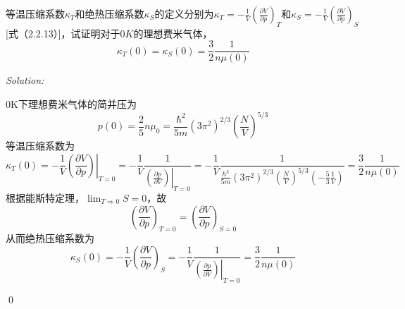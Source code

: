 \documentclass[12pt,a4paper]{article}
\newenvironment{problem}[2][Problem]{\begin{trivlist}
\item[\hskip \labelsep {\bfseries #1}\hskip \labelsep {\bfseries #2.}]}{\end{trivlist}}
\newenvironment{sol}
    {\emph{Solution:}
    }
    {
    \qed
    }
\begin{document}
\begin{problem}{8.17}
等温压缩系数$\kappa_T$和绝热压缩系数$\kappa_S$的定义分别为$\kappa_T=-\frac{1}{V}\left(\frac{\partial V}{\partial p}\right)_T$和$\kappa_S=-\frac{1}{V}\left(\frac{\partial V}{\partial p}\right)_S$[式（2.2.13）]，试证明对于$0K$的理想费米气体，
\[
\kappa_T(0)=\kappa_S(0)=\frac{3}{2}\frac{1}{n\mu(0)}
\]
\end{problem}
\begin{sol}
$0$K下理想费米气体的简并压为
\begin{equation}
p(0)=\frac{2}{5}n\mu_0=\frac{\hbar^2}{5m}(3\pi^2)^{2/3}\left(\frac{N}{V}\right)^{5/3}
\end{equation}
等温压缩系数为
\begin{equation}
\kappa_T(0)=-\frac{1}{V}\left.\left(\frac{\partial V}{\partial p}\right)\right|_{T=0}=-\frac{1}{V}\frac{1}{\left(\left.\frac{\partial p}{\partial V}\right)\right|_{T=0}}=-\frac{1}{V}\frac{1}{\frac{\hbar^3}{5m}(3\pi^2)^{2/3}\left(\frac{N}{V}\right)^{5/3}\left(-\frac{5}{3}\frac{1}{V}\right)}=\frac{3}{2}\frac{1}{n\mu(0)}
\end{equation}
根据能斯特定理，$\lim_{T\Rightarrow0}S=0$，故
\begin{equation}
\left(\frac{\partial V}{\partial p}\right)_{T=0}=\left(\frac{\partial V}{\partial p}\right)_{S=0}
\end{equation}
从而绝热压缩系数为
\begin{equation}
\kappa_S(0)=-\frac{1}{V}\left(\frac{\partial V}{\partial p}\right)_S=-\frac{1}{V}\frac{1}{\left(\left.\frac{\partial p}{\partial V}\right)\right|_{T=0}}=\frac{3}{2}\frac{1}{n\mu(0)}
\end{equation}
\end{sol}
\end{document}
